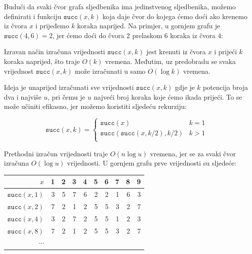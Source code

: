 Budući da svaki čvor grafa sljedbenika ima
jedinstvenog sljedbenika, možemo definirati i funkciju $\texttt{succ}(x,k)$
koja daje čvor do kojega ćemo doći ako
krenemo iz čvora $x$ i prijeđemo $k$ koraka naprijed.
Na primjer, u gornjem grafu je $\texttt{succ}(4,6)=2$,
jer ćemo doći do čvora 2 prelaskom 6 koraka iz čvora 4:

\begin{center}
\end{center}

Izravan način izračuna vrijednosti $\texttt{succ}(x,k)$
jest krenuti iz čvora $x$ i prijeći $k$ koraka naprijed, što traje $O(k)$ vremena.
Međutim, uz predobradu se svaka vrijednost $\texttt{succ}(x,k)$
može izračunati u samo $O(\log k)$ vremena.

Ideja je unaprijed izračunati sve vrijednosti $\texttt{succ}(x,k)$ gdje je
$k$ potencija broja dva i najviše $u$, pri čemu je $u$
najveći broj koraka koje ćemo ikada prijeći.
To se može učiniti efikasno, jer
možemo koristiti sljedeću rekurziju:

\begin{equation*}
    \texttt{succ}(x,k) = \begin{cases}
               \texttt{succ}(x)              & k = 1\\
               \texttt{succ}(\texttt{succ}(x,k/2),k/2)   & k > 1\\
           \end{cases}
\end{equation*}

Prethodni izračun vrijednosti traje $O(n \log u)$ vremena,
jer se za svaki čvor izračuna $O(\log u)$ vrijednosti.
U gornjem grafu prve vrijednosti su sljedeće:

\begin{center}
\begin{tabular}{r|rrrrrrrrr}
$x$ & 1 & 2 & 3 & 4 & 5 & 6 & 7 & 8 & 9 \\
\hline
$\texttt{succ}(x,1)$ & 3 & 5 & 7 & 6 & 2 & 2 & 1 & 6 & 3 \\
$\texttt{succ}(x,2)$ & 7 & 2 & 1 & 2 & 5 & 5 & 3 & 2 & 7 \\
$\texttt{succ}(x,4)$ & 3 & 2 & 7 & 2 & 5 & 5 & 1 & 2 & 3 \\
$\texttt{succ}(x,8)$ & 7 & 2 & 1 & 2 & 5 & 5 & 3 & 2 & 7 \\
$\cdots$ \\
\end{tabular}
\end{center}

